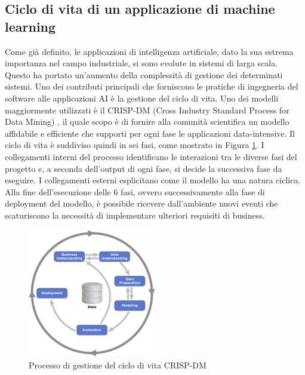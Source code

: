 \subsection{Ciclo di vita di un applicazione di machine learning}
Come già definito, le applicazioni di intelligenza artificiale, dato la sua estrema importanza nel campo industriale, si sono evolute in sistemi di larga scala. Questo ha portato un'aumento della complessità di gestione dei determinati sistemi. Uno dei contributi principali che forniscono le pratiche di ingegneria del software alle applicazioni AI è la gestione del ciclo di vita.
Uno dei modelli maggiormente utilizzati è il CRISP-DM (Cross Industry Standard Process for Data Mining) \cite{crispdmWirth}, il quale scopo è di fornire alla comunità scientifica un modello affidabile e efficiente che supporti per ogni fase le applicazioni data-intensive.
Il ciclo di vita è suddiviso quindi in sei fasi, come mostrato in Figura \ref{fig:crisp_dm_process}.
I collegamenti interni del processo identificano le interazioni tra le diverse fasi del progetto e, a seconda dell'output di ogni fase, si decide la successiva fase da eseguire.
I collegamenti esterni esplicitano come il modello ha una natura ciclica. Alla fine dell'esecuzione delle 6 fasi, ovvero successivamente alla fase di deployment del modello, è possibile ricevere dall'ambiente nuovi eventi che scaturiscono la necessità di implementare ulteriori requisiti di business.
\begin{figure}[h]
    \centering
    \includegraphics[width=0.5\textwidth]{Figure/Background/CRISP-DM_Process_Diagram.png}
    \caption{Processo di gestione del ciclo di vita CRISP-DM}
    \label{fig:crisp_dm_process}
\end{figure}

